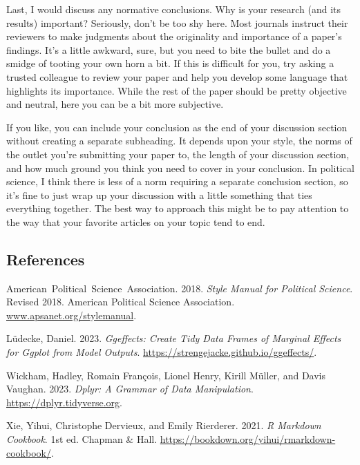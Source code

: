 \documentclass[12pt]{article}
\newlength{\cslhangindent}
\newlength{\cslentryspacingunit} %
\newenvironment{CSLReferences}[2] %
 {%
  \setlength{\parindent}{0pt}
  \ifodd #1
  \let\oldpar\par
  \def\par{\hangindent=\cslhangindent\oldpar}
  \fi
  \setlength{\parskip}{#2\cslentryspacingunit}
 }%
 {}
\begin{document}
Last, I would discuss any normative conclusions. Why is your research (and its results) important? Seriously, don't be too shy here. Most journals instruct their reviewers to make judgments about the originality and importance of a paper's findings. It's a little awkward, sure, but you need to bite the bullet and do a smidge of tooting your own horn a bit. If this is difficult for you, try asking a trusted colleague to review your paper and help you develop some language that highlights its importance. While the rest of the paper should be pretty objective and neutral, here you can be a bit more subjective.

If you like, you can include your conclusion as the end of your discussion section without creating a separate subheading. It depends upon your style, the norms of the outlet you're submitting your paper to, the length of your discussion section, and how much ground you think you need to cover in your conclusion. In political science, I think there is less of a norm requiring a separate conclusion section, so it's fine to just wrap up your discussion with a little something that ties everything together. The best way to approach this might be to pay attention to the way that your favorite articles on your topic tend to end.

\newpage

\hypertarget{references}{%
\subsection*{References}\label{references}}

\hypertarget{refs}{}
\begin{CSLReferences}{1}{0}
\leavevmode{}%
American~Political~Science~Association. 2018. \emph{Style Manual for Political Science}. Revised 2018. American Political Science Association. \href{https://www.apsanet.org/stylemanual}{www.apsanet.org/stylemanual}.

\leavevmode{}%
Lüdecke, Daniel. 2023. \emph{Ggeffects: Create Tidy Data Frames of Marginal Effects for Ggplot from Model Outputs}. \url{https://strengejacke.github.io/ggeffects/}.

\leavevmode{}%
Wickham, Hadley, Romain François, Lionel Henry, Kirill Müller, and Davis Vaughan. 2023. \emph{Dplyr: A Grammar of Data Manipulation}. \url{https://dplyr.tidyverse.org}.

\leavevmode{}%
Xie, Yihui, Christophe Dervieux, and Emily Rierderer. 2021. \emph{R Markdown Cookbook}. 1st ed. Chapman \& Hall. \url{https://bookdown.org/yihui/rmarkdown-cookbook/}.

\end{CSLReferences}
\end{document}
